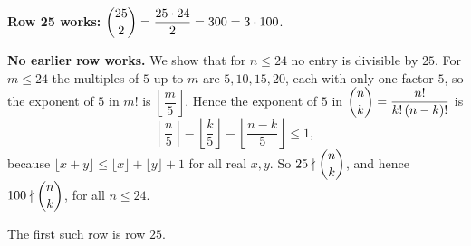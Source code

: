 \textbf{Row 25 works:} $\dbinom{25}{2}=\dfrac{25\cdot24}{2}=300=3\cdot100$.

\textbf{No earlier row works.} We show that for $n\le24$ no entry is divisible by $25$. For $m\le24$ the multiples of $5$ up to $m$ are $5,10,15,20$, each with only one factor $5$, so the exponent of $5$ in $m!$ is $\left\lfloor\dfrac m5\right\rfloor$. Hence the exponent of $5$ in $\dbinom nk=\dfrac{n!}{k!\,(n-k)!}$ is
\[\left\lfloor\dfrac n5\right\rfloor-\left\lfloor\dfrac k5\right\rfloor-\left\lfloor\dfrac{n-k}{5}\right\rfloor\le1,\]
because $\lfloor x+y\rfloor\le\lfloor x\rfloor+\lfloor y\rfloor+1$ for all real $x,y$. So $25\nmid\dbinom nk$, and hence $100\nmid\dbinom nk$, for all $n\le24$.

The first such row is row $\boxed{25}$.
